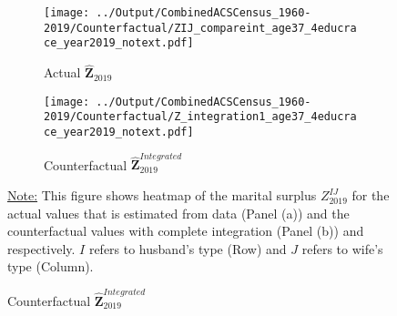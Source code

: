 \begin{figure}[H] \caption{Marital Surplus Matrix in 2019, Actual vs. Complete Integration}      \label{fig:Zcompare}
    \begin{subfigure}[b]{0.47\textwidth}  
          \centering 
        \texttt{[image: ../Output/CombinedACSCensus\_1960-2019/Counterfactual/ZIJ\_compareint\_age37\_4educrace\_year2019\_notext.pdf]}
         \caption{Actual $\hat{\mathbf{Z}}_{2019}$}  
        \end{subfigure}
      \hfill
  \begin{subfigure}[b]{0.47\textwidth}
           \centering
         \texttt{[image: ../Output/CombinedACSCensus\_1960-2019/Counterfactual/Z\_integration1\_age37\_4educrace\_year2019\_notext.pdf]}
         \caption{Counterfactual $\hat{\mathbf{Z}}^{Integrated}_{2019}$} 
     \end{subfigure}
  
        \begin{fignote} 
\underline{Note:} This figure shows heatmap of the marital surplus $Z^{IJ}_{2019}$ for the actual values that is estimated from data (Panel (a)) and the counterfactual values with complete integration (Panel (b)) and respectively. $I$ refers to husband's type (Row) and $J$ refers to wife's type (Column). 
\end{fignote}
\end{figure}






